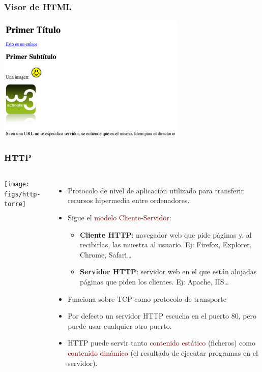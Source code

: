 \documentclass[hyperref={pdfpagelabels=true},ucs]{beamer}
\newcommand{\res}[1]{\textcolor{darkred}{#1}}
\begin{document}
\begin{frame}
\frametitle{Visor de HTML}

\begin{center}
\includegraphics[width=90mm]{figs/html-example}
\end{center}

\end{frame}





\begin{frame}
\frametitle{HTTP}

\begin{columns}[l]

\column{35mm}

\begin{center}
\texttt{[image: figs/http-torre]}
\end{center}

\column{90mm}

\begin{itemize}
\item Protocolo de nivel de aplicación utilizado para transferir
  recursos hipermedia entre ordenadores.
\item Sigue el \res{modelo Cliente-Servidor}:
  \begin{itemize}
  \item \textbf{Cliente HTTP}: navegador web que pide páginas y, al recibirlas, las
    muestra al usuario. Ej: Firefox, Explorer, Chrome, Safari\ldots
  \item \textbf{Servidor HTTP}: servidor web en el que están alojadas páginas que
    piden los clientes. Ej: Apache, IIS\ldots
  \end{itemize}
\item Funciona sobre TCP como protocolo de transporte
\item Por defecto un servidor HTTP escucha en el puerto 80, pero puede
  usar cualquier otro puerto.
\item HTTP puede servir tanto \res{contenido estático} (ficheros) como
  \res{contenido dinámico} (el resultado de ejecutar programas en el
  servidor).
\end{itemize}

\end{columns}

\end{frame}
\end{document}
